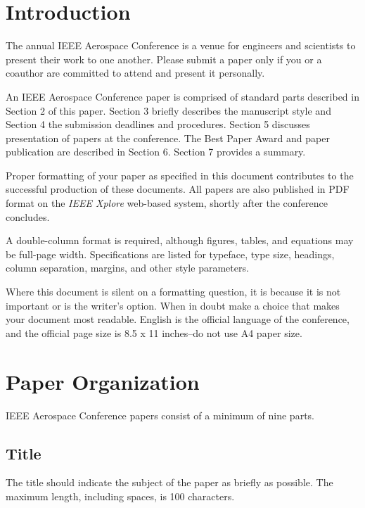 \documentclass[twocolumn,letterpaper]{IEEEAerospaceCLS}  %
\begin{document}
\tableofcontents

\section{Introduction}
The annual IEEE Aerospace Conference is a venue for engineers and scientists to present their work to one another. Please submit a paper only if you or a coauthor are committed to attend and present it personally.

An IEEE Aerospace Conference paper is comprised of standard parts described in Section 2 of this paper. Section 3 briefly describes the manuscript style and Section 4 the submission deadlines and procedures. Section 5 discusses presentation of papers at the conference. The Best Paper Award and paper publication are described in Section 6. Section 7 provides a summary.

Proper formatting of your paper as specified in this document contributes to the successful production of these documents. All papers are also published in PDF format on the {\it IEEE Xplore} web-based system, shortly after the conference concludes.

A double-column format is required, although figures, tables, and equations may be full-page width. Specifications are listed for typeface, type size, headings, column separation, margins, and other style parameters.

Where this document is silent on a formatting question, it is because it is not important or is the writer's option. When in doubt make a choice that makes your document most readable. English is the official language of the conference, and the official page size is 8.5 x 11 inches--do not use A4 paper size.



\section{Paper Organization}
IEEE Aerospace Conference papers consist of a minimum of nine parts.

\subsection{Title}
The title should indicate the subject of the paper as briefly as possible. The maximum length, including spaces, is 100 characters.
\end{document}
